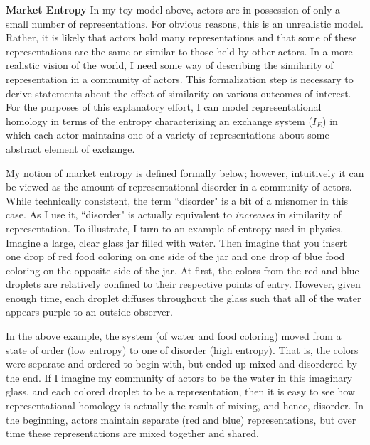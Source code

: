 \textbf{Market Entropy}
In my toy model above, actors are in possession of only a small number of representations. For obvious reasons, this is an unrealistic model. Rather, it is likely that actors hold many representations and that some of these representations are the same or similar to those held by other actors. In a more realistic vision of the world, I need some way of describing the similarity of representation in a community of actors. This formalization step is necessary to derive statements about the effect of similarity on various outcomes of interest. For the purposes of this explanatory effort, I can model representational homology in terms of the entropy characterizing an exchange system ($I_E$) in which each actor maintains one of a variety of representations about some abstract element of exchange.  
 
My notion of market entropy is defined formally below; however, intuitively it can be viewed as the amount of representational disorder in a community of actors. While technically consistent, the term ``disorder" is a bit of a misnomer in this case. As I use it, ``disorder" is actually equivalent to \emph{increases} in similarity of representation. To illustrate, I turn to an example of entropy used in physics. Imagine a large, clear glass jar filled with water. Then imagine that you insert one drop of red food coloring on one side of the jar and one drop of blue food coloring on the opposite side of the jar. At first, the colors from the red and blue droplets are relatively confined to their respective points of entry. However, given enough time, each droplet diffuses throughout the glass such that all of the water appears purple to an outside observer. 
 
In the above example, the system (of water and food coloring) moved from a state of order (low entropy) to one of disorder (high entropy). That is, the colors were separate and ordered to begin with, but ended up mixed and disordered by the end. If I imagine my community of actors to be the water in this imaginary glass, and each colored droplet to be a representation, then it is easy to see how representational homology is actually the result of mixing, and hence, disorder. In the beginning, actors maintain separate (red and blue) representations, but over time these representations are mixed together and shared.
 
